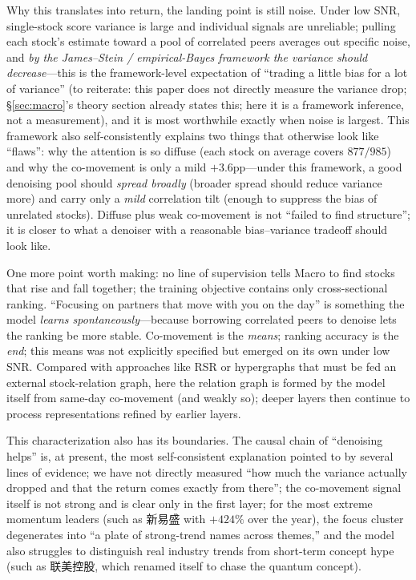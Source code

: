 \documentclass[a4paper,11pt]{article}
\begin{document}
Why this translates into return, the landing point is still noise. Under low
SNR, single-stock score variance is large and individual signals are
unreliable; pulling each stock's estimate toward a pool of correlated peers
averages out specific noise, and \emph{by the James--Stein / empirical-Bayes
framework the variance should decrease}---this is the framework-level
expectation of ``trading a little bias for a lot of variance'' (to reiterate:
this paper does not directly measure the variance drop; \S\ref{sec:macro}'s
theory section already states this; here it is a framework inference, not a
measurement), and it is most worthwhile exactly when noise is largest. This
framework also self-consistently explains two things that otherwise look like
``flaws'': why the attention is so diffuse (each stock on average covers
$877/985$) and why the co-movement is only a mild $+3.6$pp---under this
framework, a good denoising pool should \emph{spread broadly} (broader spread
should reduce variance more) and carry only a \emph{mild} correlation tilt
(enough to suppress the bias of unrelated stocks). Diffuse plus weak
co-movement is not ``failed to find structure''; it is closer to what a
denoiser with a reasonable bias--variance tradeoff should look like.

One more point worth making: no line of supervision tells Macro to find stocks
that rise and fall together; the training objective contains only
cross-sectional ranking. ``Focusing on partners that move with you on the day''
is something the model \emph{learns spontaneously}---because borrowing
correlated peers to denoise lets the ranking be more stable. Co-movement is the
\emph{means}; ranking accuracy is the \emph{end}; this means was not explicitly
specified but emerged on its own under low SNR. Compared with approaches like
RSR or hypergraphs that must be fed an external stock-relation graph, here the
relation graph is formed by the model itself from same-day co-movement (and
weakly so); deeper layers then continue to process representations refined by
earlier layers.

This characterization also has its boundaries. The causal chain of ``denoising
helps'' is, at present, the most self-consistent explanation pointed to by
several lines of evidence; we have not directly measured ``how much the
variance actually dropped and that the return comes exactly from there''; the
co-movement signal itself is not strong and is clear only in the first layer;
for the most extreme momentum leaders (such as 新易盛 with $+424\%$ over the
year), the focus cluster degenerates into ``a plate of strong-trend names
across themes,'' and the model also struggles to distinguish real industry
trends from short-term concept hype (such as 联美控股, which renamed
itself to chase the quantum concept).
\end{document}
